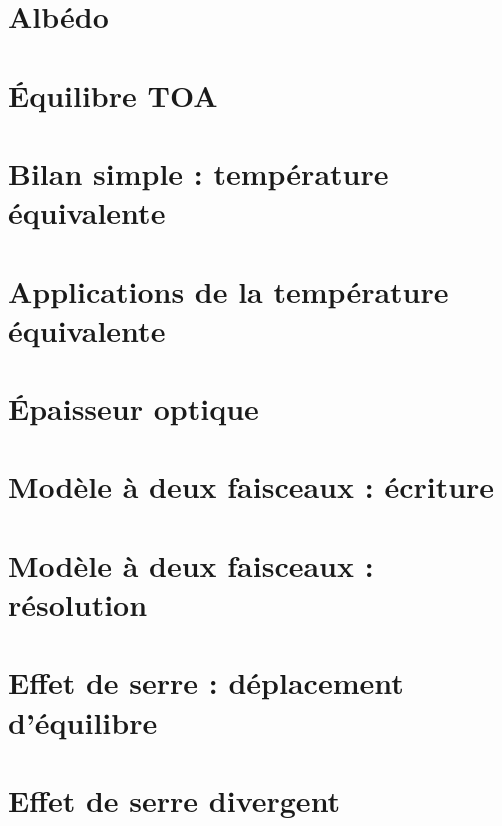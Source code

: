 \documentclass[a4paper,DIV16,10pt]{scrartcl}
\begin{document}
\newpage 
\section{Albédo} 


\newpage
\section{\'Equilibre TOA}


\newpage
\section{Bilan simple : température équivalente}


\newpage
\section{Applications de la température équivalente}


\newpage
\section{\'Epaisseur optique}


\newpage
\section{Modèle à deux faisceaux : écriture}


\newpage
\section{Modèle à deux faisceaux : résolution}


\newpage
\section{Effet de serre : déplacement d'équilibre}


\newpage
\section{Effet de serre divergent}

\end{document}
